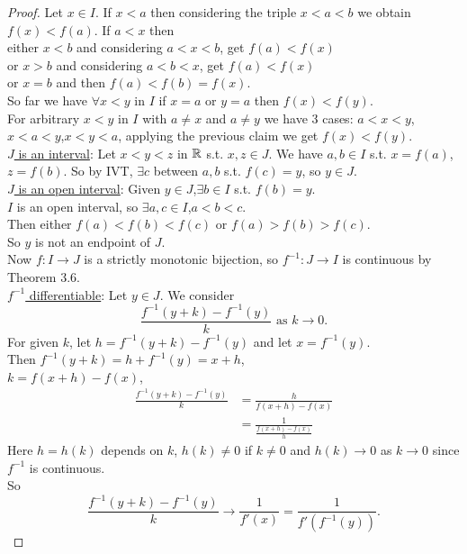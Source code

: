\documentclass[a4paper]{article}
\begin{document}
\begin{thm}
\begin{proof}
Let $x\in I$. If $x<a$ then considering the triple $x<a<b$ we obtain $f\left(x\right)<f\left(a\right)$. If $a<x$ then\\
either $x<b$ and considering $a<x<b$, get $f\left(a\right)<f\left(x\right)$\\
or $x>b$ and considering $a<b<x$, get $f\left(a\right)<f\left(x\right)$\\
or $x=b$ and then $f\left(a\right)<f\left(b\right)=f\left(x\right)$.\\
So far we have $\forall x<y$ in $I$ if $x=a$ or $y=a$ then $f\left(x\right)<f\left(y\right)$.\\
For arbitrary $x<y$ in $I$ with $a\neq x$ and $a \neq y$ we have 3 cases: $a<x<y$,$x<a<y$,$x<y<a$, applying the previous claim we get $f\left(x\right)<f\left(y\right)$.\\
\underline{$J$ is an interval}: Let $x<y<z$ in $\mathbb{R}$ s.t. $x,z\in J$. We have $a,b\in I$ s.t. $x=f\left(a\right)$,$z=f\left(b\right)$. So by IVT, $\exists c$ between $a,b$ s.t. $f\left(c\right)=y$, so $y\in J$.\\
\underline{$J$ is an open interval}: Given $y\in J$,$\exists b\in I$ s.t. $f\left(b\right)=y$.\\
$I$ is an open interval, so $\exists a,c\in I$,$a<b<c$.\\
Then either $f\left(a\right)<f\left(b\right)<f\left(c\right)$ or $f\left(a\right)>f\left(b\right)>f\left(c\right)$.\\
So $y$ is not an endpoint of $J$.\\

Now $f:I\to J$ is a strictly monotonic bijection, so $f^{-1}:J\to I$ is continuous by Theorem 3.6.\\
\underline{$f^{-1}$ differentiable}: Let $y\in J$. We consider
\begin{equation*}
\frac{f^{-1}\left(y+k\right)-f^{-1}\left(y\right)}{k} \text{ as } k\to 0.
\end{equation*}
For given $k$, let $h=f^{-1}\left(y+k\right)-f^{-1}\left(y\right)$ and let $x=f^{-1}\left(y\right)$.\\
Then $f^{-1}\left(y+k\right)=h+f^{-1}\left(y\right)=x+h$,\\
$k=f\left(x+h\right)-f\left(x\right)$,
\begin{equation*}
\begin{aligned}
\frac{f^{-1}\left(y+k\right)-f^{-1}\left(y\right)}{k}&=\frac{h}{f\left(x+h\right)-f\left(x\right)}\\
&=\frac{1}{\frac{f\left(x+h\right)-f\left(x\right)}{h}}
\end{aligned}
\end{equation*}
Here $h=h\left(k\right)$ depends on $k$, $h\left(k\right) \neq 0$ if $k\neq 0$ and $h\left(k\right) \to 0$ as $k \to 0$ since $f^{-1}$ is continuous.\\
So
\begin{equation*}
\frac{f^{-1}\left(y+k\right)-f^{-1}\left(y\right)}{k} \to \frac{1}{f'\left(x\right)} = \frac{1}{f'\left(f^{-1}\left(y\right)\right)}.
\end{equation*}
\end{proof}
\end{thm}
\end{document}
